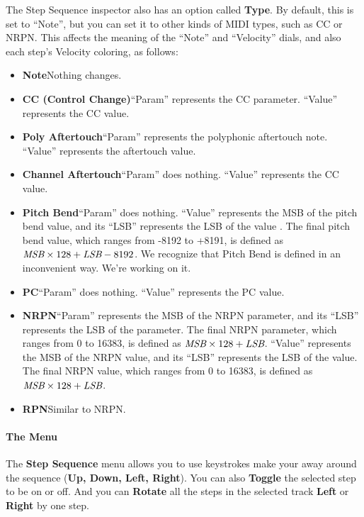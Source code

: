 \documentclass[twoside,10pt]{article}
\begin{document}
The Step Sequence inspector also has an option called {\bf Type}.  By default, this is set to ``Note'', but you can set it to other kinds of MIDI types, such as CC or NRPN.   This affects the meaning of the ``Note'' and ``Velocity'' dials, and also each step's Velocity coloring, as follows:

\begin{itemize}
\item {\bf Note}\qquad Nothing changes.
\item {\bf CC (Control Change)}\qquad ``Param'' represents the CC parameter.  ``Value'' represents the CC value.
\item {\bf Poly Aftertouch}\qquad ``Param'' represents the polyphonic aftertouch note.  ``Value'' represents the aftertouch value.
\item {\bf Channel Aftertouch}\qquad ``Param'' does nothing.  ``Value'' represents the CC value.
\item {\bf Pitch Bend}\qquad ``Param'' does nothing.  ``Value'' represents the MSB of the pitch bend value, and its ``LSB'' represents the LSB of the value .  The final pitch bend value, which ranges from -8192 to +8191, is defined as \(\text{\it MSB} \times 128 + \text{\it LSB} - 8192\). We recognize that Pitch Bend is defined in an inconvenient way.  We're working on it.
\item {\bf PC}\qquad ``Param'' does nothing.  ``Value'' represents the PC value.
\item {\bf NRPN}\qquad ``Param'' represents the MSB of the NRPN parameter, and its ``LSB'' represents the LSB of the parameter.   The final NRPN parameter, which ranges from 0 to 16383, is defined as \(\text{\it MSB} \times 128 + \text{\it LSB}\).  ``Value'' represents the MSB of the NRPN value, and its ``LSB'' represents the LSB of the value.  The final NRPN value, which ranges from 0 to 16383, is defined as \(\text{\it MSB} \times 128 + \text{\it LSB}\).  
\item {\bf RPN}\qquad Similar to NRPN.
\end{itemize}

\paragraph{The Menu}

The {\bf Step Sequence} menu allows you to use keystrokes make your away around the sequence ({\bf Up, Down, Left, Right}).  You can also {\bf Toggle} the selected step to be on or off.  And you can {\bf Rotate} all the steps in the selected track {\bf Left} or {\bf Right} by one step.
\end{document}
